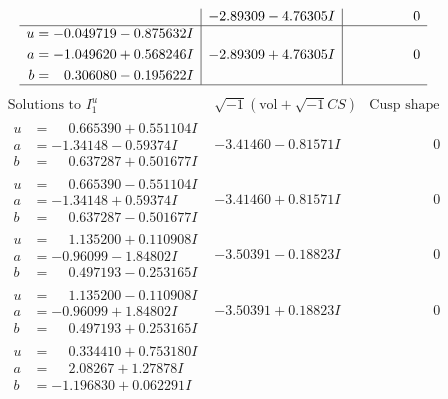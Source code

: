 \documentclass[1p]{elsarticle_modified}
\theoremstyle{definition}
\newcommand{\I}{\sqrt{-1}}
\begin{document}
$$\begin{array}{c|c|c}
 & -2.89309 - 4.76305 I & \phantom{-0.000000 } 0 \\ \hline\begin{aligned}
u &= -0.049719 - 0.875632 I \\
a &= -1.049620 + 0.568246 I \\
b &= \phantom{-}0.306080 - 0.195622 I\end{aligned}
 & -2.89309 + 4.76305 I & \phantom{-0.000000 } 0\\
 \hline 
 \end{array}$$\newpage$$\begin{array}{c|c|c}  
\text{Solutions to }I^u_{1}& \I (\text{vol} + \sqrt{-1}CS) & \text{Cusp shape}\\
 \hline 
\begin{aligned}
u &= \phantom{-}0.665390 + 0.551104 I \\
a &= -1.34148 - 0.59374 I \\
b &= \phantom{-}0.637287 + 0.501677 I\end{aligned}
 & -3.41460 - 0.81571 I & \phantom{-0.000000 } 0 \\ \hline\begin{aligned}
u &= \phantom{-}0.665390 - 0.551104 I \\
a &= -1.34148 + 0.59374 I \\
b &= \phantom{-}0.637287 - 0.501677 I\end{aligned}
 & -3.41460 + 0.81571 I & \phantom{-0.000000 } 0 \\ \hline\begin{aligned}
u &= \phantom{-}1.135200 + 0.110908 I \\
a &= -0.96099 - 1.84802 I \\
b &= \phantom{-}0.497193 - 0.253165 I\end{aligned}
 & -3.50391 - 0.18823 I & \phantom{-0.000000 } 0 \\ \hline\begin{aligned}
u &= \phantom{-}1.135200 - 0.110908 I \\
a &= -0.96099 + 1.84802 I \\
b &= \phantom{-}0.497193 + 0.253165 I\end{aligned}
 & -3.50391 + 0.18823 I & \phantom{-0.000000 } 0 \\ \hline\begin{aligned}
u &= \phantom{-}0.334410 + 0.753180 I \\
a &= \phantom{-}2.08267 + 1.27878 I \\
b &= -1.196830 + 0.062291 I\end{aligned}

\end{array}$$
\end{document}
